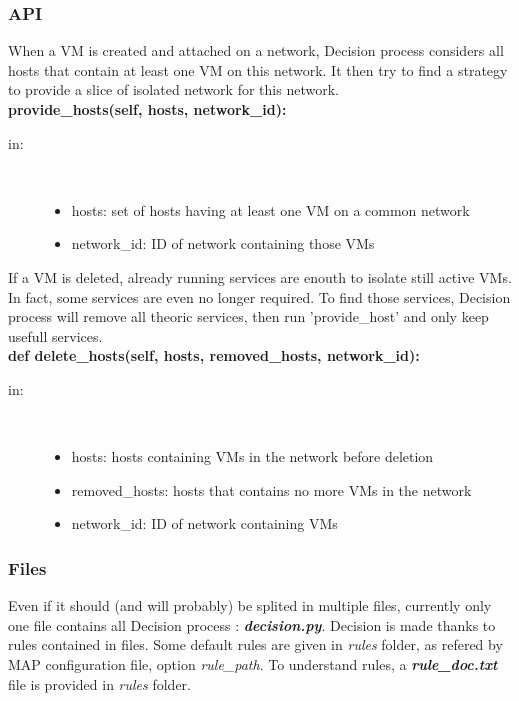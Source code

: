\subsubsection{API}
When a VM is created and attached on a network, Decision process considers all hosts that contain at least one VM on this network. It then try to find a strategy to provide a slice of isolated network for this network.\\
\textbf{provide\_hosts(self, hosts, network\_id):}
\begin{description}
    \item[in:] \hfill \\
        \begin{itemize}
            \item hosts: set of hosts having at least one VM on a common network
            \item network\_id: ID of network containing those VMs
        \end{itemize}
\end{description}
If a VM is deleted, already running services are enouth to isolate still active VMs. In fact, some services are even no longer required. To find those services, Decision process will remove all theoric services, then run 'provide\_host' and only keep usefull services.\\
\textbf{def delete\_hosts(self, hosts, removed\_hosts, network\_id):}
\begin{description}
    \item[in:] \hfill \\
        \begin{itemize}
            \item hosts: hosts containing VMs in the network before deletion
            \item removed\_hosts: hosts that contains no more VMs in the network
            \item network\_id: ID of network containing VMs
        \end{itemize}
\end{description}

\subsubsection{Files}
Even if it should (and will probably) be splited in multiple files, currently only one file contains all Decision process : \emph{\textbf{decision.py}}. Decision is made thanks to rules contained in files. Some default rules are given in \emph{rules} folder, as refered by MAP configuration file, option \emph{rule\_path}. To understand rules, a \emph{\textbf{rule\_doc.txt}} file is provided in \emph{rules} folder.

